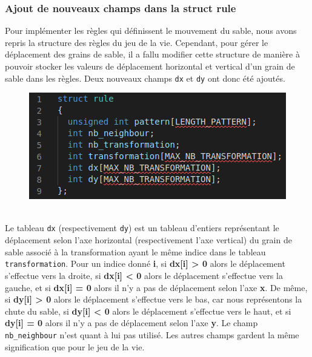 \documentclass[a4paper]{article}
\begin{document}
\subsubsection{Ajout de nouveaux champs dans la struct rule}
Pour implémenter les règles qui définissent le mouvement du sable, nous avons repris la structure des règles du jeu de la vie. Cependant, pour gérer le déplacement des grains de sable, il a fallu modifier cette structure de manière à pouvoir stocker les valeurs de déplacement horizontal et vertical d'un grain de sable dans les règles. Deux nouveaux champs \texttt{dx} et \texttt{dy} ont donc été ajoutés.
\begin{figure}[htb]
    \centering
    \includegraphics[scale=0.7]{img/rules2.png}    
\end{figure}
\\\indent Le tableau \texttt{dx} (respectivement \texttt{dy}) est un tableau d'entiers représentant le déplacement selon l'axe horizontal (respectivement l'axe vertical) du grain de sable associé à la transformation ayant le même indice dans le tableau \texttt{transformation}. Pour un indice donné \textbf{i}, si \textbf{dx[i] > 0} alors le déplacement s'effectue vers la droite, si \textbf{dx[i] < 0} alors le déplacement s'effectue vers la gauche, et si \textbf{dx[i] = 0} alors il n'y a pas de déplacement selon l'axe \textbf{x}. De même, si \textbf{dy[i] > 0} alors le déplacement s'effectue vers le bas, car nous représentons la chute du sable, si \textbf{dy[i] < 0} alors le déplacement s'effectue vers le haut, et si \textbf{dy[i] = 0} alors il n'y a pas de déplacement selon l'axe \textbf{y}. Le champ \texttt{nb\_neighbour} n'est quant à lui pas utilisé. Les autres champs gardent la même signification que pour le jeu de la vie.
\end{document}
